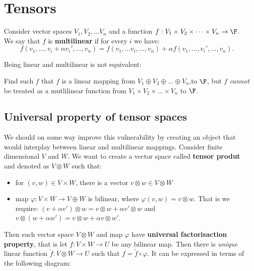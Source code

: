 \section{Tensors}
Consider vector spaces $V_1, V_2,\dots V_n$ and a function $f: V_1\times V_2\times\dots\times V_n\to \F$. We say that $f$ is \textbf{multilinear} if for every $i$ we have:
$$f(v_1,\dots, v_i+\alpha v_i', \dots, v_n) = f(v_1,\dots v_i, \dots, v_n) + \alpha f(v_1,\dots, v_i', \dots, v_n).$$

Being linear and multilinear is not equivalent:
\begin{prob}
  Find such $f$ that $f$ is a linear mapping from $V_1\oplus V_2\oplus\dots\oplus V_n$,to $\F$, but $f$ \textit{cannot} be treated as a mutlilinear function from
  $V_1\times V_2\times \dots \times V_n$ to $\F$.
\end{prob}

\subsection{Universal property of tensor spaces}

We should on some way improve this vulnerability by creating an object that would interplay between linear and multilinear mappings.
Consider finite dimensional $V$ and $W$. We want to create a vector space called \textbf{tensor produt} and denoted as $V\otimes W$ such that:
\begin{itemize}
  \item for $(v,w)\in V\times W$, there is a vector $v\otimes w\in V\otimes W$
  \item map $\varphi:V\times W\to V\oplus W$ is bilinear, where $\varphi(v,w)=v\otimes w$. That is we require: $(v+\alpha v')\otimes w = v\otimes w + \alpha v'\otimes w$
    and $v\otimes (w+\alpha w') = v\otimes w + \alpha v\otimes w'$.
\end{itemize}
Then such vector space $V\otimes W$ and map $\varphi$ have \textbf{universal factorisaction property}, that is let $f : V\times W\to U$ be any bilinear map. Then there is \textit{unique} linear function $\tilde f:V\otimes W\to U$ such that $f = \tilde f\circ\varphi$. It can be expressed in terms of the following diagram:

\begin{figure}
  \centering
\end{figure}

